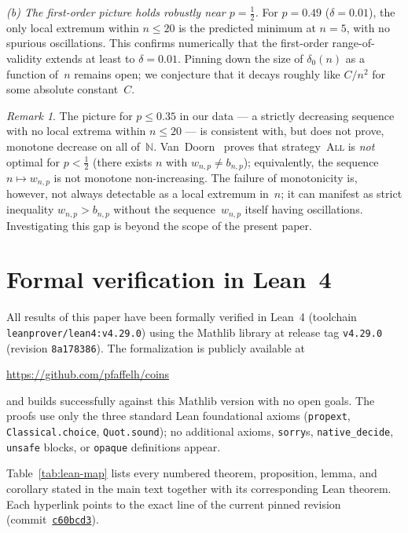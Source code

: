 \documentclass[reqno,final,11pt]{amsart}
\theoremstyle{plain}
\theoremstyle{definition}
\theoremstyle{remark}
\newtheorem{remark}[theorem]{Remark}
\newcommand{\All}{\textsc{All}}
\begin{document}
\emph{(b) The first-order picture holds robustly near $p=\tfrac12$.}
For $p=0.49$ ($\delta=0.01$), the only local extremum within
$n\le 20$ is the predicted minimum at $n=5$, with no spurious
oscillations.  This confirms numerically that the first-order
range-of-validity extends at least to $\delta=0.01$.  Pinning down
the size of $\delta_0(n)$ as a function of~$n$ remains open; we
conjecture that it decays roughly like $C/n^2$ for some absolute
constant~$C$.

\begin{remark}
  The picture for $p\le 0.35$ in our data --- a strictly
  decreasing sequence with no local extrema within $n\le 20$ ---
  is consistent with, but does not prove, monotone decrease on
  all of~$\mathbb{N}$.  Van~Doorn~\citeyearpar{vanDoorn2024} proves that
  strategy~\All{} is \emph{not} optimal for $p<\tfrac12$ (there
  exists $n$ with $w_{n,p}\ne b_{n,p}$); equivalently, the
  sequence $n\mapsto w_{n,p}$ is not monotone non-increasing.
  The failure of monotonicity is, however, not always detectable
  as a local extremum in~$n$; it can manifest as strict inequality
  $w_{n,p}>b_{n,p}$ without the sequence~$w_{n,p}$ itself having
  oscillations.  Investigating this gap is beyond the scope of the
  present paper.
\end{remark}

\appendix

\section{Formal verification in Lean~4}\label{app:lean}

All results of this paper have been formally verified in
Lean~4 (toolchain \texttt{leanprover/lean4:v4.29.0}) using the
Mathlib library at release tag \texttt{v4.29.0} (revision
\texttt{8a178386}).  The formalization is publicly available at
\begin{center}
  \url{https://github.com/pfaffelh/coins}
\end{center}
and builds successfully against this Mathlib version with no open
goals.  The proofs use only the three standard Lean foundational
axioms (\texttt{propext}, \texttt{Classical.choice},
\texttt{Quot.sound}); no additional axioms, \texttt{sorry}s,
\texttt{native\_decide}, \texttt{unsafe} blocks, or
\texttt{opaque} definitions appear.

Table~\ref{tab:lean-map} lists every numbered theorem,
proposition, lemma, and corollary stated in the main text together
with its corresponding Lean theorem.  Each hyperlink points to the
exact line of the current pinned revision
(commit~\href{https://github.com/pfaffelh/coins/tree/c60bcd3}{\texttt{c60bcd3}}).
\end{document}
